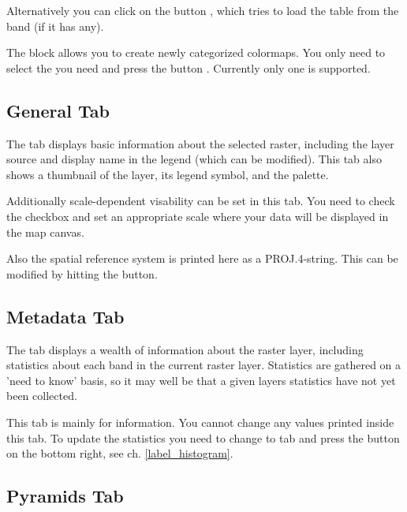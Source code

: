Alternatively you can click on the button
, which tries to
load the table from the band (if it has any).

The block  allows you to create newly
categorized colormaps. You only need to select the  you need and press the button . Currently
only one  is
supported.

\subsection{General Tab}\label{label_generaltab}

The  tab displays basic information about the selected raster,
including the layer source and  display name in the legend (which can be
modified). This tab also shows a thumbnail of the layer, its legend symbol,
and the palette.

Additionally scale-dependent visability can be set in this tab. You need to
check the checkbox and set an appropriate scale where your data will be
displayed in the map canvas.

Also the spatial reference system is printed here as a PROJ.4-string.
This can be modified by hitting the  button.

\subsection{Metadata Tab}\label{label_metatab}

The  tab displays a wealth of information about the raster layer,
including statistics about each band in the current raster layer. Statistics
are gathered on a 'need to know' basis, so it may well be that a given layers
statistics have not yet been collected.

This tab is mainly for information. You cannot change any values printed
inside this tab. To update the statistics you need to change to tab
 and press the button  on the bottom right,
see ch. \ref{label_histogram}.

\subsection{Pyramids Tab}\label{raster_pyramids}

